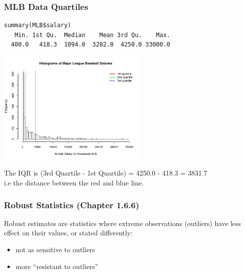 \documentclass[handout]{beamer}
\newcommand{\blue}[1]{\textcolor{blue2}{#1}}
\begin{document}
\begin{frame}[fragile]
\frametitle{MLB Data Quartiles}

\begin{verbatim}
summary(MLB$salary)
   Min. 1st Qu.  Median    Mean 3rd Qu.    Max.
  400.0   418.3  1094.0  3282.0  4250.0 33000.0
\end{verbatim}

\begin{center}
\includegraphics[height=5.5cm]{figure/MLB_quartiles.pdf}
\end{center}

\pause The IQR is (3rd Quartile - 1st Quartile) = 4250.0 - 418.3 = 3831.7\\
i.e the distance between the red and blue line.  


\end{frame}










\begin{frame}
\frametitle{Robust Statistics (Chapter 1.6.6)}
\blue{Robust estimates} are statistics where extreme observations (outliers) have less effect on their values, or stated differently:
\begin{itemize}
\pause\item not as sensitive to outliers
\pause\item more ``resistant to outliers''
\end{itemize}

\end{frame}
\end{document}
